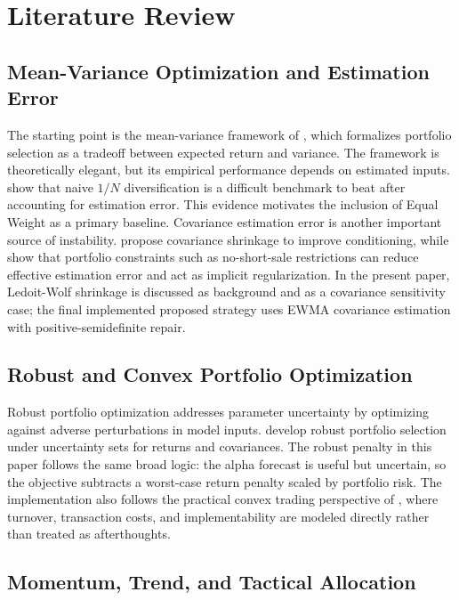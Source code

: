 \documentclass[11pt]{article}
\begin{document}
\section{Literature Review}
\label{sec:literature}

\subsection{Mean-Variance Optimization and Estimation Error}

The starting point is the mean-variance framework of \citet{markowitz1952}, which
formalizes portfolio selection as a tradeoff between expected return and variance.
The framework is theoretically elegant, but its empirical performance depends on
estimated inputs. \citet{demiguel2009} show that naive \(1/N\) diversification is a
difficult benchmark to beat after accounting for estimation error. This evidence
motivates the inclusion of Equal Weight as a primary baseline. Covariance estimation
error is another important source of instability. \citet{ledoitwolf2004} propose
covariance shrinkage to improve conditioning, while \citet{jagannathanma2003} show
that portfolio constraints such as no-short-sale restrictions can reduce effective
estimation error and act as implicit regularization. In the present paper,
Ledoit-Wolf shrinkage is discussed as background and as a covariance sensitivity
case; the final implemented proposed strategy uses EWMA covariance estimation with
positive-semidefinite repair.

\subsection{Robust and Convex Portfolio Optimization}

Robust portfolio optimization addresses parameter uncertainty by optimizing against
adverse perturbations in model inputs. \citet{goldfarbiyengar2003} develop robust
portfolio selection under uncertainty sets for returns and covariances. The robust
penalty in this paper follows the same broad logic: the alpha forecast is useful but
uncertain, so the objective subtracts a worst-case return penalty scaled by portfolio
risk. The implementation also follows the practical convex trading perspective of
\citet{boyd2017}, where turnover, transaction costs, and implementability are modeled
directly rather than treated as afterthoughts.

\subsection{Momentum, Trend, and Tactical Allocation}
\end{document}
